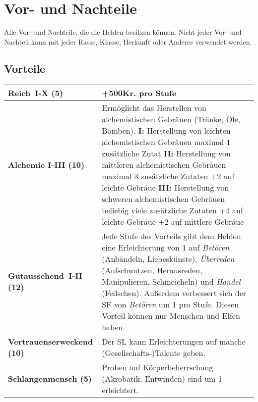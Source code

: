 {\let\clearpage\relax\chapter{Vor- und Nachteile}
\label{chap:vor_und_nachteile}}
Alle Vor- und Nachteile, die die Helden besitzen können. Nicht jeder Vor- und Nachteil kann mit jeder Rasse, Klasse, Herkunft oder Anderes verwendet werden.

\section{Vorteile}
\label{chap:vorteile}
\begin{longtable}{|p{5cm}|p{11cm}|}

\hline
\textbf{Reich~I-X (5)} & +500Kr. pro Stufe \\ \hline

\textbf{Alchemie I-III (10)} & Ermöglicht das Herstellen von alchemistischen Gebräuen (Tränke, Öle, Bomben). \newline \textbf{I:} Herstellung von leichten alchemistischen Gebräuen \newline maximal 1 zusätzliche Zutat \newline \textbf{II:} Herstellung von mittleren alchemistischen Gebräuen \newline maximal 3 zusätzliche Zutaten \newline +2 auf leichte Gebräue \newline \textbf{III:} Herstellung von schweren alchemistischen Gebräuen \newline beliebig viele zusätzliche Zutaten \newline +4 auf leichte Gebräue \newline +2 auf mittlere Gebräue \\ \hline

\textbf{Gutaussehend~I-II (12)} & Jede Stufe des Vorteils gibt dem Helden eine Erleichterung von 1 auf \textit{Betören} (Anbändeln, Liebeskünste), \textit{Überreden} (Aufschwatzen, Herausreden, Manipulieren, Schmeicheln) und \textit{Handel} (Feilschen). Außerdem verbessert sich der SF von \textit{Betören} um 1 pro Stufe. Diesen Vorteil können nur Menschen und Elfen haben. \\ \hline

\textbf{Vertrauenserweckend (10)} & Der SL kann Erleichterungen auf manche (Gesellschafts-)Talente geben. \\ \hline

\textbf{Schlangenmensch (5)} & Proben auf Körperbeherrschung (Akrobatik, Entwinden) sind um 1 erleichtert. \\ \hline


\end{longtable}
